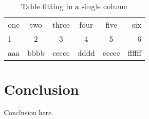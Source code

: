 \documentclass{pramana}
\begin{document}

\begin{table}[htb]
\caption{Table fitting in a single column}\label{tableExample}
\begin{tabular}{|l|cccc|r|}
\hline
one& two &three&four&five&six\\
1&2&3&4&5&6\\
aaa&bbbb& ccccc&dddd&eeeee&ffffff\\
\hline
\end{tabular}
\end{table}










\section{Conclusion}
Conclusion here.
\end{document}
